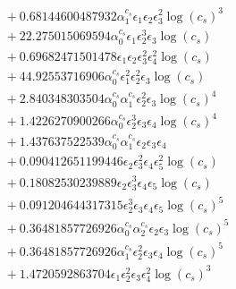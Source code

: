\documentclass[10pt]{article}
\begin{document}
\begin{align*}
&{}  + 0.68144600487932 \alpha_{1}^{c_s} \epsilon_{1} \epsilon_{2} \epsilon_{3}^{2} \log{\left(c_{s} \right)}^{3} \\
&{}  + 22.275015069594 \alpha_{0}^{c_s} \epsilon_{1} \epsilon_{2}^{3} \epsilon_{3} \log{\left(c_{s} \right)} \\
&{}  + 0.69682471501478 \epsilon_{1} \epsilon_{2} \epsilon_{3}^{2} \epsilon_{4}^{2} \log{\left(c_{s} \right)} \\
&{}  + 44.92553716906 \alpha_{0}^{c_s} \epsilon_{1}^{2} \epsilon_{2}^{2} \epsilon_{3} \log{\left(c_{s} \right)} \\
&{}  + 2.840348303504 \alpha_{0}^{c_s} \alpha_{1}^{c_s} \epsilon_{2}^{2} \epsilon_{3} \log{\left(c_{s} \right)}^{4} \\
&{}  + 1.4226270900266 \alpha_{0}^{c_s} \epsilon_{2}^{3} \epsilon_{3} \epsilon_{4} \log{\left(c_{s} \right)}^{4} \\
&{}  + 1.437637522539 \alpha_{0}^{c_s} \alpha_{1}^{c_s} \epsilon_{2} \epsilon_{3} \epsilon_{4} \\
&{}  + 0.090412651199446 \epsilon_{2} \epsilon_{3}^{2} \epsilon_{4} \epsilon_{5}^{2} \log{\left(c_{s} \right)} \\
&{}  + 0.18082530239889 \epsilon_{2} \epsilon_{3}^{3} \epsilon_{4} \epsilon_{5} \log{\left(c_{s} \right)} \\
&{}  + 0.091204644317315 \epsilon_{2}^{3} \epsilon_{3} \epsilon_{4} \epsilon_{5} \log{\left(c_{s} \right)}^{5} \\
&{}  + 0.36481857726926 \alpha_{0}^{c_s} \alpha_{2}^{c_s} \epsilon_{2} \epsilon_{3} \log{\left(c_{s} \right)}^{5} \\
&{}  + 0.36481857726926 \alpha_{1}^{c_s} \epsilon_{2}^{2} \epsilon_{3} \epsilon_{4} \log{\left(c_{s} \right)}^{5} \\
&{}  + 1.4720592863704 \epsilon_{1} \epsilon_{2}^{2} \epsilon_{3} \epsilon_{4}^{2} \log{\left(c_{s} \right)}^{3}
\end{align*}
\end{document}
